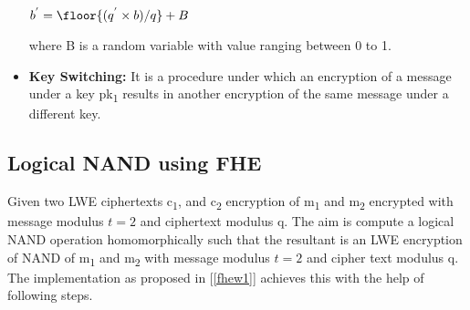 \begin{itemize}
\hspace{3cm}$b^{'}=\floor{(q^{'}\times b)/q}+B$

where B is a random variable with value ranging between 0 to 1.
\item
\textbf{Key Switching:} It is a procedure under which an encryption of a message under a key pk\textsubscript{1} results in another encryption of the same message under a different key. 
\end{itemize}
\subsection{Logical NAND using FHE} \label{3.1.2}
Given two LWE ciphertexts c\textsubscript{1}, and c\textsubscript{2} encryption of m\textsubscript{1} and m\textsubscript{2} encrypted with message modulus $t=2$ and ciphertext modulus q. The aim is compute a logical NAND operation homomorphically such that the resultant is an LWE encryption of NAND of m\textsubscript{1} and m\textsubscript{2} with message modulus $t=2$ and cipher text modulus q. The implementation as proposed in [\ref{fhew1}] achieves this with the help of following steps.

